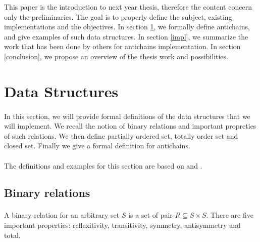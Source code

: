 \documentclass[11pt,a4paper]{article}
\theoremstyle{definition}
\begin{document}
This paper is the introduction to next year thesis, therefore
the content concern only the preliminaries. The goal is to
properly define the subject,
existing implementations and the objectives.
In section \ref{data_structures}, we formally define antichains,
and give examples of such data structures. In section \ref{impl},
we summarize the work that has been done by others
for antichains implementation. In section \ref{conclusion}, we propose
an overview of the thesis work and possibilities.

\newpage

\section{Data Structures}

\label{data_structures}

\paragraph{}

In this section, we will provide formal definitions of the data
structures that we will implement. We recall the notion of binary relations
and important propreties of such relations.
We then define partially ordered set, totally order set and closed set.
Finally we give a formal definition for antichains.

\paragraph{}

The definitions and examples for this section are based on \cite{bohy_phd}
and \cite{maquet_phd}.


\subsection{Binary relations}

\paragraph{}

A binary relation for an arbitrary set $S$ is
a set of pair $R \subseteq S \times S$.
There are five important properties: reflexitivity, transitivity,
symmetry, antisymmetry and total.

\paragraph{}
\end{document}
